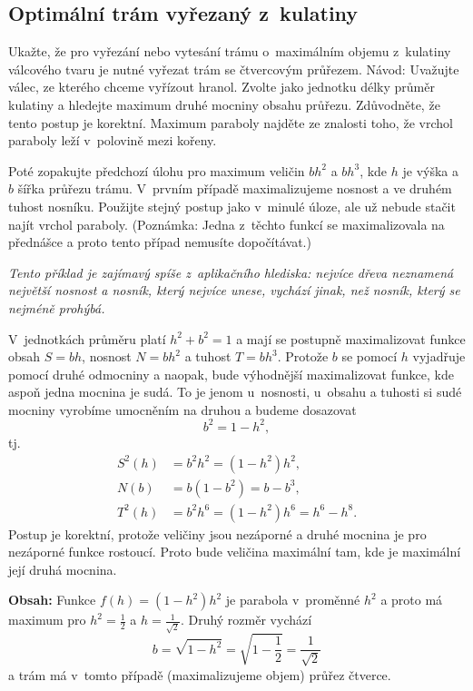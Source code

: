 \stranka

\subsection{Optimální trám vyřezaný z kulatiny}
Ukažte, že pro vyřezání nebo vytesání trámu o maximálním objemu z kulatiny válcového tvaru je nutné vyřezat trám se čtvercovým
průřezem. Návod: Uvažujte válec, ze kterého chceme vyřízout
hranol. Zvolte jako jednotku délky průměr kulatiny a hledejte maximum
druhé mocniny obsahu průřezu. Zdůvodněte, že tento postup je
korektní. Maximum paraboly najděte ze znalosti toho, že vrchol
paraboly leží v polovině mezi kořeny.

Poté zopakujte předchozí úlohu pro maximum veličin $bh^2$ a $bh^3$, kde $h$
je výška a $b$ šířka průřezu trámu. V prvním případě maximalizujeme
nosnost a ve druhém tuhost nosníku. Použijte stejný postup jako v minulé úloze, ale už nebude stačit najít vrchol paraboly. (Poznámka: Jedna z těchto funkcí se maximalizovala na přednášce a proto tento případ nemusíte dopočítávat.)

\textit{Tento příklad je zajímavý spíše z aplikačního hlediska: nejvíce dřeva neznamená největší nosnost a nosník, který nejvíce unese, vychází jinak, než nosník, který se nejméně prohýbá.}

\reseni

V jednotkách průměru platí $h^2+b^2=1$
a mají se postupně maximalizovat funkce obsah $S=bh$, nosnost $N=bh^2$ a tuhost $T=bh^3$. Protože $b$ se pomocí $h$ vyjadřuje pomocí druhé odmocniny a naopak, bude výhodnější maximalizovat funkce, kde aspoň jedna mocnina je sudá. To je jenom u nosnosti, u obsahu a tuhosti si sudé mocniny vyrobíme umocněním na druhou a budeme dosazovat $$b^2=1-h^2,$$ tj.
$$
\begin{aligned}
S^2(h)&=b^2h^2=(1-h^2)h^2,\\
N(b)&=b(1-b^2)=b-b^3,\\
T^2(h)&=b^2h^6=(1-h^2)h^6=h^6-h^8.
\end{aligned}
$$
Postup je korektní, protože veličiny jsou nezáporné a druhé mocnina je pro nezáporné funkce rostoucí. Proto bude veličina maximální tam, kde je maximální její druhá mocnina.

\textbf{Obsah: }Funkce $f(h)=(1-h^2)h^2$ je parabola v proměnné $h^2$ a proto má maximum pro $h^2=\frac 12$ a $h=\frac {1}{\sqrt 2}$. Druhý rozměr vychází
$$b=\sqrt{1-h^2}=\sqrt{1-\frac 12}=\frac{1}{\sqrt 2}$$ a trám má v tomto případě (maximalizujeme objem) průřez čtverce.

